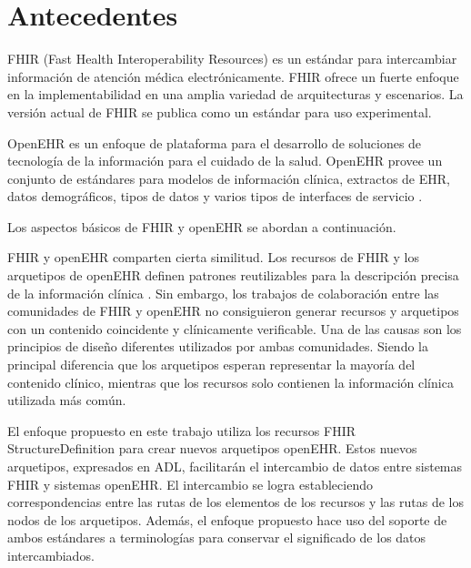 \section{Antecedentes}

FHIR (Fast Health Interoperability Resources) es un estándar para intercambiar información de atención médica electrónicamente. FHIR ofrece un fuerte enfoque en la implementabilidad en una amplia variedad de arquitecturas y escenarios. La versión actual de FHIR se publica como un estándar para uso experimental.

OpenEHR es un enfoque de plataforma para el desarrollo de soluciones de tecnología de la información para el cuidado de la salud. OpenEHR provee un conjunto de estándares para modelos de información clínica, extractos de EHR, datos demográficos, tipos de datos y varios tipos de interfaces de servicio \cite{openEHRWhitePaper}.

Los aspectos básicos de FHIR y openEHR se abordan a continuación.





FHIR y openEHR comparten cierta similitud. Los recursos de FHIR y los arquetipos de openEHR definen patrones reutilizables para la descripción precisa de la información clínica \cite{Bosca15}. Sin embargo, los trabajos de colaboración entre las comunidades de FHIR y openEHR \cite{Collaboration} no consiguieron generar recursos y arquetipos con un contenido coincidente y clínicamente verificable. Una de las causas son los principios de diseño diferentes utilizados por ambas comunidades. Siendo la principal diferencia que los arquetipos esperan representar la mayoría del contenido clínico, mientras que los recursos solo contienen la información clínica utilizada más común.

El enfoque propuesto en este trabajo utiliza los recursos FHIR StructureDefinition para crear nuevos arquetipos openEHR. Estos nuevos arquetipos, expresados en ADL, facilitarán el intercambio de datos entre sistemas FHIR y sistemas openEHR. El intercambio se logra estableciendo correspondencias entre las rutas de los elementos de los recursos y las rutas de los nodos de los arquetipos. Además, el enfoque propuesto hace uso del soporte de ambos estándares a terminologías para conservar el significado de los datos intercambiados.
